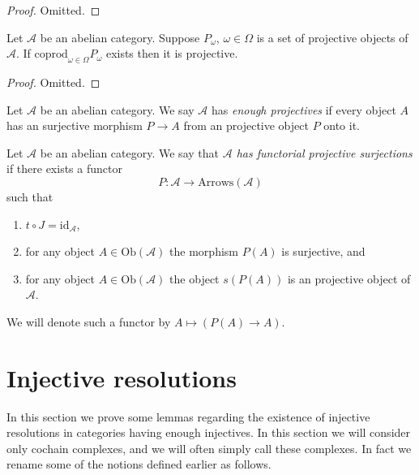 \begin{proof}
Omitted.
\end{proof}

\begin{lemma}
\label{lemma-coproduct-projectives}
Let $\mathcal{A}$ be an abelian category.
Suppose $P_\omega$, $\omega \in \Omega$ is a set of projective
objects of $\mathcal{A}$. If $\text{coprod}_{\omega \in \Omega} P_\omega$
exists then it is projective.
\end{lemma}

\begin{proof}
Omitted.
\end{proof}

\begin{definition}
\label{definition-enough-projectives}
Let $\mathcal{A}$ be an abelian category.
We say $\mathcal{A}$ has {\it enough projectives}
if every object $A$ has an surjective morphism
$P \to A$ from an projective object $P$ onto it.
\end{definition}

\begin{definition}
\label{definition-functorial-projective-surjections}
Let $\mathcal{A}$ be an abelian category.
We say that {\it $\mathcal{A}$ has functorial projective surjections}
if there exists a functor
$$
P : \mathcal{A} \longrightarrow \text{Arrows}(\mathcal{A})
$$
such that
\begin{enumerate}
\item $t \circ J = \text{id}_{\mathcal{A}}$,
\item for any object $A \in \text{Ob}(\mathcal{A})$
the morphism $P(A)$ is surjective, and
\item for any object $A \in \text{Ob}(\mathcal{A})$
the object $s(P(A))$ is an projective object of $\mathcal{A}$.
\end{enumerate}
We will denote such a functor by
$A \mapsto (P(A) \to A)$.
\end{definition}





\section{Injective resolutions}
\label{section-injective-resolutions}

\noindent
In this section we prove some lemmas regarding the existence
of injective resolutions in categories having enough injectives.
In this section we will consider only cochain complexes, and we will
often simply call these complexes.
In fact we rename some of the notions defined earlier as follows.

